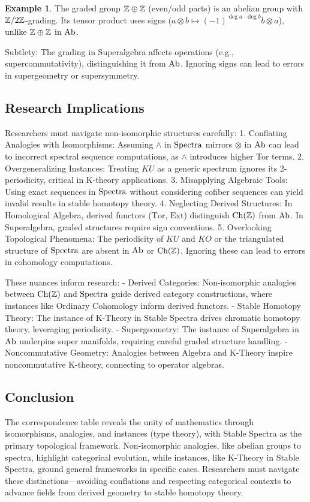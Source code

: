 \documentclass{article}
\theoremstyle{plain}
\theoremstyle{definition}
\newtheorem{example}{Example}
\begin{document}
\begin{example}
The graded group \(\mathbb{Z} \oplus \mathbb{Z}\) (even/odd parts) is an abelian group with \(\mathbb{Z}/2\mathbb{Z}\)-grading. Its tensor product uses signs (\(a \otimes b \mapsto (-1)^{\deg a \cdot \deg b} b \otimes a\)), unlike \(\mathbb{Z} \oplus \mathbb{Z}\) in \(\text{Ab}\).
\end{example}

Subtlety: The grading in Superalgebra affects operations (e.g., supercommutativity), distinguishing it from \(\text{Ab}\). Ignoring signs can lead to errors in supergeometry or supersymmetry.

\subsection{Research Implications}

Researchers must navigate non-isomorphic structures carefully:
1. Conflating Analogies with Isomorphisms: Assuming \(\wedge\) in \(\text{Spectra}\) mirrors \(\otimes\) in \(\text{Ab}\) can lead to incorrect spectral sequence computations, as \(\wedge\) introduces higher Tor terms.
2. Overgeneralizing Instances: Treating \(KU\) as a generic spectrum ignores its 2-periodicity, critical in K-theory applications.
3. Misapplying Algebraic Tools: Using exact sequences in \(\text{Spectra}\) without considering cofiber sequences can yield invalid results in stable homotopy theory.
4. Neglecting Derived Structures: In Homological Algebra, derived functors (\(\text{Tor}\), \(\text{Ext}\)) distinguish \(\text{Ch}(\mathbb{Z})\) from \(\text{Ab}\). In Superalgebra, graded structures require sign conventions.
5. Overlooking Topological Phenomena: The periodicity of \(KU\) and \(KO\) or the triangulated structure of \(\text{Spectra}\) are absent in \(\text{Ab}\) or \(\text{Ch}(\mathbb{Z})\). Ignoring these can lead to errors in cohomology computations.

These nuances inform research:
- Derived Categories: Non-isomorphic analogies between \(\text{Ch}(\mathbb{Z})\) and \(\text{Spectra}\) guide derived category constructions, where instances like Ordinary Cohomology inform derived functors.
- Stable Homotopy Theory: The instance of K-Theory in Stable Spectra drives chromatic homotopy theory, leveraging periodicity.
- Supergeometry: The instance of Superalgebra in \(\text{Ab}\) underpins super manifolds, requiring careful graded structure handling.
- Noncommutative Geometry: Analogies between Algebra and K-Theory inspire noncommutative K-theory, connecting to operator algebras.

\subsection{Conclusion}

The correspondence table reveals the unity of mathematics through isomorphisms, analogies,
and instances (type theory), with Stable Spectra as the primary topological framework.
Non-isomorphic analogies, like abelian groups to spectra, highlight categorical evolution,
while instances, like K-Theory in Stable Spectra, ground general frameworks in specific cases.
Researchers must navigate these distinctions—avoiding conflations and respecting categorical
contexts to advance fields from derived geometry to stable homotopy theory.
\end{document}
